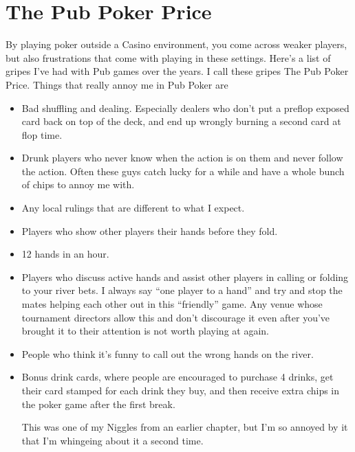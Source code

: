 \chapter{The Pub Poker Price}


By playing poker outside a Casino environment, you come across
weaker players, but also frustrations that come with playing
in these settings. Here's a list of gripes I've had with Pub
games over the years. I call these gripes The Pub Poker Price.
Things that really annoy me in Pub Poker are

\begin{itemize}

\item Bad shuffling and dealing. Especially dealers who don't
put a preflop exposed card back on top of the deck, and end
up wrongly burning a second card at flop time.

\item Drunk players who never know when the action is on them and
never follow the action. Often these guys catch lucky for a while
and have a whole bunch of chips to annoy me with.

\item Any local rulings that are different to what I expect.

\item Players who show other players their hands before they fold.

\item 12 hands in an hour.

\item Players who discuss active hands and assist other players in
calling or folding to your river bets. I always say ``one
player to a hand'' and try and stop the mates helping each other
out in this ``friendly'' game. Any venue whose tournament directors
allow this and don't discourage it even after you've brought
it to their attention is not worth playing at again.

\item People who think it's funny to call out the wrong hands on the river.

\item Bonus drink cards, where people are encouraged to purchase 4 drinks,
get their card stamped for each drink they buy, and then receive extra
chips in the poker game after the first break.

This was one of my Niggles from an earlier chapter, but I'm so annoyed
by it that I'm whingeing about it a second time.


\end{itemize}
